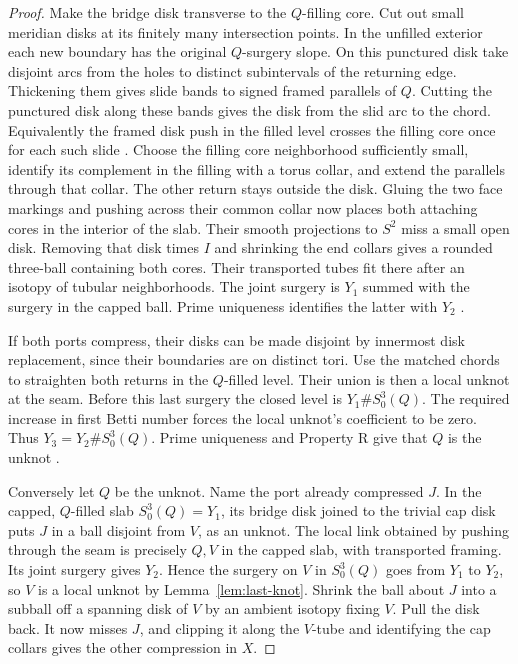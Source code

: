 \documentclass[11pt,letterpaper]{article}
\numberwithin{equation}{section}
\theoremstyle{remark}
\begin{document}
\begin{proof}
Make the bridge disk transverse to the \(Q\)-filling core. Cut out
small meridian disks at its finitely many intersection points. In
the unfilled exterior each new boundary has the original \(Q\)-surgery
slope. On this punctured disk take disjoint arcs from the holes
to distinct subintervals of the returning edge. Thickening them
gives slide bands to signed framed parallels of \(Q\). Cutting the
punctured disk along these bands gives the disk from the slid arc
to the chord. Equivalently the framed disk push in the filled level
crosses the filling core once for each such slide
\cite[proof of Proposition~3.2]{GompfScharlemannThompson2010}.
Choose the filling core neighborhood sufficiently small, identify
its complement in the filling with a torus collar, and extend the
parallels through that collar. The other return stays outside the
disk. Gluing the two face markings and pushing across their common
collar now places both attaching cores in the interior of the slab.
Their smooth projections to \(S^2\) miss a small open disk. Removing
that disk times \(I\) and shrinking the end collars gives a rounded
three-ball containing both cores. Their transported tubes fit there
after an isotopy of tubular neighborhoods. The joint surgery is
\(Y_1\) summed with the surgery in the capped ball. Prime uniqueness
identifies the latter with \(Y_2\) \cite{Milnor1962Prime}.

If both ports compress, their disks can be made disjoint by innermost
disk replacement, since their boundaries are on distinct tori.
Use the matched chords to straighten both returns in the \(Q\)-filled
level. Their union is then a local unknot at the seam. Before this last
surgery the closed level is \(Y_1\# S^3_0(Q)\). The required increase
in first Betti number forces the local unknot's coefficient to be zero.
Thus \(Y_3=Y_2\# S^3_0(Q)\). Prime uniqueness and Property R give
that \(Q\) is the unknot \cite{Gabai1987FoliationsIII}.

Conversely let \(Q\) be the unknot. Name the port already compressed
\(J\). In the capped, \(Q\)-filled slab \(S^3_0(Q)=Y_1\), its bridge
disk joined to the trivial cap disk puts \(J\) in a ball disjoint from
\(V\), as an unknot. The local link obtained by pushing through the
seam is precisely \(Q,V\) in the capped slab, with transported
framing. Its joint surgery gives \(Y_2\). Hence the surgery on \(V\)
in \(S^3_0(Q)\) goes from \(Y_1\) to \(Y_2\), so \(V\) is a local
unknot by Lemma~\ref{lem:last-knot}. Shrink the ball about \(J\)
into a subball off a spanning disk of \(V\) by an ambient isotopy
fixing \(V\). Pull the disk back. It now misses \(J\), and clipping
it along the \(V\)-tube and identifying the cap collars gives the
other compression in \(X\).
\end{proof}
\end{document}
